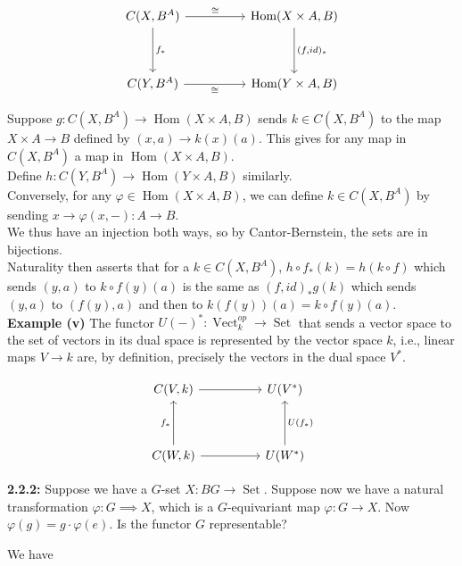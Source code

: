 \documentclass[a4paper]{article}
\DeclareMathOperator{\Hom}{Hom}
\DeclareMathOperator{\Vect}{Vect}
\DeclareMathOperator{\Set}{Set}
\begin{document}
\[\begin{tikzcd}
	{C(X, B^A)} && {\text{Hom}(X \times A,B)} \\
	\\
	{C(Y,B^A)} && {\text{Hom}(Y \times A,B)}
	\arrow["{f_*}", from=1-1, to=3-1]
	\arrow["{(f,id)_*}", from=1-3, to=3-3]
	\arrow["\cong", from=1-1, to=1-3]
	\arrow["\cong"', from=3-1, to=3-3]
\end{tikzcd}\]

Suppose $g  \colon C(X,B^{A}) \to \Hom(X\times A,B)$ sends
$k \in C(X, B^{A})$ to
the map $X \times A \to B$ defined by
$(x,a) \to k(x)(a)$. This gives for any map
in  $C(X, B^{A})$ a map in $\Hom(X \times A,B)$.\\
Define $h  \colon C(Y, B^{A}) \to \Hom(Y \times A,B)$ similarly.\\
\linebreak
Conversely, for any $\varphi \in \Hom(X \times A,B)$, we can define
$k \in C(X, B^{A})$ by
sending $x \to \varphi(x, -)  \colon A \to B$.\\
We thus have an injection both ways, so by Cantor-Bernstein, the
sets are in bijections.\\
Naturality then asserts that for a $k \in C(X, B^{A})$,
$h \circ f_* (k) = h\left( k \circ f \right) $ which sends
$(y,a)$ to $k\circ f(y)(a)$ is the same as
$(f,id)_* g(k)$ which sends
$(y,a)$ to $(f(y), a)$ and then to
$k(f(y))(a) = k\circ f (y) (a)$.\\
\linebreak
\textbf{Example (v)} The functor $U(-)^{*}  \colon 
\Vect_{k}^{op} \to \Set$ that sends a vector space to the set of vectors in its
dual space is represented by the vector space $k$, i.e., linear maps
$V \to k$ are, by definition, precisely the vectors in the dual space
$V^{*}$.

\[\begin{tikzcd}
	{C(V,k)} && {U(V^*)} \\
	\\
	{C(W,k)} && {U(W^*)}
	\arrow["{f_*}", from=3-1, to=1-1]
	\arrow["{U(f_*)}"', from=3-3, to=1-3]
	\arrow[from=3-1, to=3-3]
	\arrow[from=1-1, to=1-3]
\end{tikzcd}\]


\textbf{2.2.2:} Suppose we have a $G$-set $X  \colon BG \to \Set$. Suppose now
we have a natural transformation $\varphi  \colon G \implies X$, which is a 
$G$-equivariant map $\varphi  \colon G \to X$. 
Now $\varphi (g) = g \cdot \varphi(e)$. Is the functor $G$ representable?

We have
\end{document}
